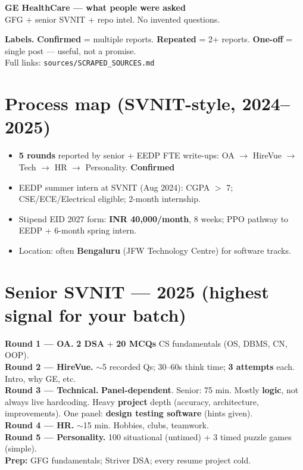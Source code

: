 \documentclass[11pt,a4paper]{article}
\newcommand{\tg}[1]{\textcolor{tag}{\textbf{\footnotesize #1}}}
\newcommand{\rnd}[1]{\textcolor{accent}{\textbf{#1}}}
\newcommand{\card}[1]{%
  \par\vspace{5pt}%
  \noindent\colorbox{soft}{%
    \parbox{\dimexpr\textwidth-2\fboxsep}{\vspace{6pt}#1\vspace{6pt}}%
  }\par\vspace{7pt}%
}
\begin{document}
\begin{center}
  {\LARGE\bfseries\color{accent}GE HealthCare --- what people were asked}\\[5pt]
  {\color{muted}GFG + senior SVNIT + repo intel. No invented questions.}
\end{center}

\vspace{4pt}
\card{
\textbf{Labels.} \tg{Confirmed} = multiple reports. \tg{Repeated} = 2+ reports. \tg{One-off} = single post --- useful, not a promise.\\
Full links: \texttt{sources/SCRAPED\_SOURCES.md}
}

\section{Process map (SVNIT-style, 2024--2025)}
\begin{itemize}
  \item \textbf{5 rounds} reported by senior + EEDP FTE write-ups: OA $\rightarrow$ HireVue $\rightarrow$ Tech $\rightarrow$ HR $\rightarrow$ Personality. \tg{Confirmed}
  \item EEDP summer intern at SVNIT (Aug 2024): CGPA $>$ 7; CSE/ECE/Electrical eligible; 2-month internship.
  \item Stipend EID 2027 form: \textbf{INR 40,000/month}, 8 weeks; PPO pathway to EEDP + 6-month spring intern.
  \item Location: often \textbf{Bengaluru} (JFW Technology Centre) for software tracks.
\end{itemize}

\section{Senior SVNIT --- 2025 (highest signal for your batch)}
\card{
\rnd{Round 1 --- OA.} \textbf{2 DSA} + \textbf{20 MCQs} CS fundamentals (OS, DBMS, CN, OOP).\\[4pt]
\rnd{Round 2 --- HireVue.} $\sim$5 recorded Qs; 30--60s think time; \textbf{3 attempts} each. Intro, why GE, etc.\\[4pt]
\rnd{Round 3 --- Technical.} \textbf{Panel-dependent}. Senior: 75 min. Mostly \textbf{logic}, not always live hardcoding. Heavy \textbf{project} depth (accuracy, architecture, improvements). One panel: \textbf{design testing software} (hints given).\\[4pt]
\rnd{Round 4 --- HR.} $\sim$15 min. Hobbies, clubs, teamwork.\\[4pt]
\rnd{Round 5 --- Personality.} 100 situational (untimed) + 3 timed puzzle games (simple).\\[4pt]
\textbf{Prep:} GFG fundamentals; Striver DSA; every resume project cold.
}
\end{document}
